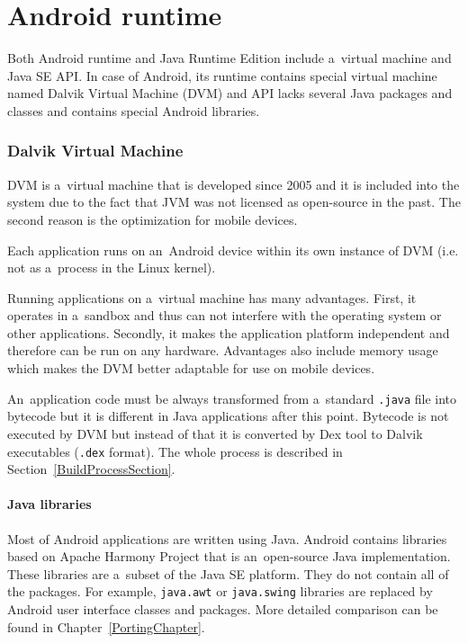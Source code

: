 \section{Android runtime}\label{AndroidRuntimeSection}
Both Android runtime and Java Runtime Edition include a~virtual machine and Java SE API. In case of Android,
its runtime contains special virtual machine named Dalvik Virtual Machine (DVM) and API lacks several Java packages and
classes and contains special Android libraries.

\subsubsection{Dalvik Virtual Machine}
DVM is a~virtual machine that is developed since 2005 and it is included into the system due to the fact that JVM was
not licensed as open-source in the past. The second reason is the optimization for mobile devices.

Each application runs on an~Android device within its own instance of DVM (i.e. not as a~process in the Linux kernel).

Running applications on a~virtual machine has many advantages. First, it operates in a~sandbox and thus can not
interfere with the operating system or other applications. Secondly, it makes the application platform independent and
therefore can be run on any hardware. Advantages also include memory usage which makes the DVM better adaptable for use
on mobile devices.

An~application code must be always transformed from a~standard \texttt{.java} file into bytecode but it is different in
Java applications after this point. Bytecode is not executed by DVM but instead of that it is converted by Dex tool to
Dalvik executables (\texttt{.dex} format). The whole process is described in Section~\ref{BuildProcessSection}.


\paragraph{Java libraries}
Most of Android applications are written using Java. Android contains libraries based on Apache Harmony Project that is
an~open-source Java implementation. These libraries are a~subset of the Java SE platform. They do not contain all of the
packages. For example, \texttt{java.awt} or \texttt{java.swing} libraries are replaced by Android user interface classes
and packages. More detailed comparison can be found in Chapter~\ref{PortingChapter}.

